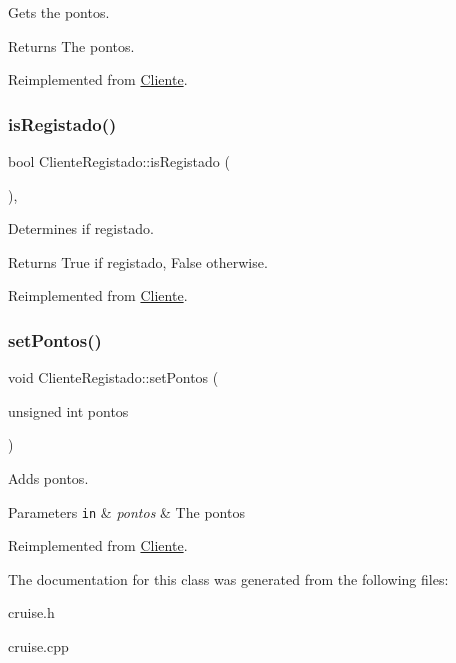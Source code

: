 Gets the pontos. 

\begin{DoxyReturn}{Returns}
The pontos. 
\end{DoxyReturn}


Reimplemented from \hyperlink{classCliente_a4bcd51f0d9a0bfe7d9d47074ac4e65de}{Cliente}.

\mbox{\label{classClienteRegistado_a3dade20423acb0e84c9fbe30c75f0e3e}} 
\subsubsection{\texorpdfstring{is\+Registado()}{isRegistado()}}
{\footnotesize\ttfamily bool Cliente\+Registado\+::is\+Registado (\begin{DoxyParamCaption}{ }\end{DoxyParamCaption})\hspace{0.3cm}{\ttfamily [inline]}, {\ttfamily [virtual]}}



Determines if registado. 

\begin{DoxyReturn}{Returns}
True if registado, False otherwise. 
\end{DoxyReturn}


Reimplemented from \hyperlink{classCliente_acb60d8bf04134b986ae56a79db8beaaf}{Cliente}.

\mbox{\label{classClienteRegistado_a93d79ba4ecd6716124c832fc2f38ddc5}} 
\subsubsection{\texorpdfstring{set\+Pontos()}{setPontos()}}
{\footnotesize\ttfamily void Cliente\+Registado\+::set\+Pontos (\begin{DoxyParamCaption}\item[{unsigned int}]{pontos }\end{DoxyParamCaption})\hspace{0.3cm}{\ttfamily [virtual]}}



Adds pontos. 


\begin{DoxyParams}[1]{Parameters}
\mbox{\tt in}  & {\em pontos} & The pontos \\
\hline
\end{DoxyParams}


Reimplemented from \hyperlink{classCliente}{Cliente}.



The documentation for this class was generated from the following files\+:\begin{DoxyCompactItemize}
\item 
cruise.\+h\item 
cruise.\+cpp\end{DoxyCompactItemize}
